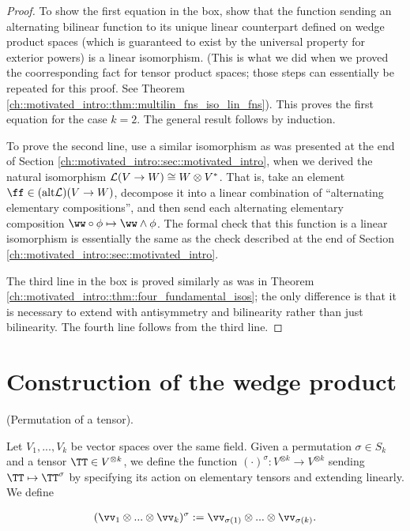 \begin{proof}
     To show the first equation in the box, show that the function sending an alternating bilinear function to its unique linear counterpart defined on wedge product spaces (which is guaranteed to exist by the universal property for exterior powers) is a linear isomorphism. (This is what we did when we proved the coorresponding fact for tensor product spaces; those steps can essentially be repeated for this proof. See Theorem \ref{ch::motivated_intro::thm::multilin_fns_iso_lin_fns}). This proves the first equation for the case $k = 2$. The general result follows by induction.  
     
    To prove the second line, use a similar isomorphism as was presented at the end of Section \ref{ch::motivated_intro::sec::motivated_intro}, when we derived the natural isomorphism $\mathcal{L}(V \rightarrow W) \cong W \otimes V^*$. That is, take an element $\ff \in (\alt \LLLL)(V \rightarrow W)$, decompose it into a linear combination of ``alternating elementary compositions'', and then send each alternating elementary composition $\ww \circ \phi \mapsto \ww \wedge \phi$. The formal check that this function is a linear isomorphism is essentially the same as the check described at the end of Section \ref{ch::motivated_intro::sec::motivated_intro}.
    
    The third line in the box is proved similarly as was in Theorem \ref{ch::motivated_intro::thm::four_fundamental_isos}; the only difference is that it is necessary to extend with antisymmetry and bilinearity rather than just bilinearity. The fourth line follows from the third line.
\end{proof}

\section*{Construction of the wedge product}

\begin{defn}
    (Permutation of a tensor).
    
    Let $V_1, ..., V_k$ be vector spaces over the same field. Given a permutation $\sigma \in S_k$ and a tensor $\TT \in V^{\otimes k}$, we define the function $(\cdot)^\sigma:V^{\otimes k} \rightarrow V^{\otimes k}$ sending $\TT \mapsto \TT^\sigma$ by specifying its action on elementary tensors and extending linearly. We define
    
    \begin{align*}
        (\vv_1 \otimes ... \otimes \vv_k)^\sigma := \vv_{\sigma(1)} \otimes ... \otimes \vv_{\sigma(k)}.
    \end{align*}
\end{defn}

